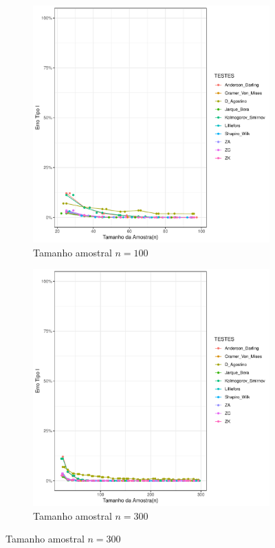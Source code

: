 \documentclass[a4paper,11pt]{article} %
\begin{document}
\begin{figure}[H]
    \vspace{0.5cm} %
    \begin{subfigure}[b]{0.45\textwidth}
        \centering
        \includegraphics[width=\textwidth]{Distribuição Cauchy/Erro Tipo I/erro_tipo_I_cauchy_100.pdf}
        \caption{Tamanho amostral \(n = 100\)}
        \label{fig:cauchy_100}
    \end{subfigure}
    \hfill
    \begin{subfigure}[b]{0.45\textwidth}
        \centering
        \includegraphics[width=\textwidth]{Distribuição Cauchy/Erro Tipo I/erro_tipo_I_cauchy_300.pdf}
        \caption{Tamanho amostral \(n = 300\)}
        \label{fig:cauchy_300}
    \end{subfigure}
    

\end{figure}
\end{document}
